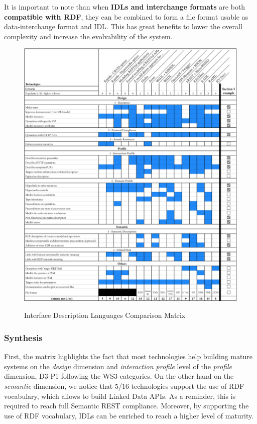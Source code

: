 It is important to note than when \textbf{IDLs and interchange formats} are both \textbf{compatible with RDF}, they can be combined to form a file format usable as data-interchange format and IDL. This has great benefits to lower the overall complexity and increase the evolvability of the system.

\begin{figure}[!ht]
\caption{Interface Description Languages Comparison Matrix}
\includegraphics[width=1\textwidth]{figures/IDL.png}
\label{idl-matrix}
\end{figure}

\subsubsection*{Synthesis}

First, the matrix highlights the fact that most technologies help building mature systems on the \textit{design} dimension and \textit{interaction profile} level of the \textit{profile} dimension, D3-P1 following the WS3 categories.
On the other hand on the \textit{semantic} dimension, we notice that 5/16 technologies support the use of RDF vocabulary, which allows to build Linked Data APIs. As a reminder, this is required to reach full Semantic REST compliance.
Moreover, by supporting the use of RDF vocabulary, IDLs can be enriched to reach a higher level of maturity.

